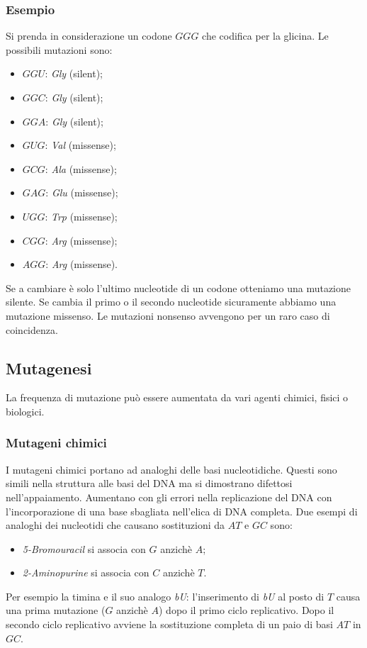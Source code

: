 		\subsubsection{Esempio}
		Si prenda in considerazione un codone $GGG$ che codifica per la glicina.
		Le possibili mutazioni sono:
		\begin{multicols}{3}
			\begin{itemize}
				\item $GGU$:  \emph{Gly} (silent);
				\item $GGC$: \emph{Gly} (silent);
				\item $GGA$:  \emph{Gly} (silent);
				\item $GUG$:  \emph{Val} (missense);
				\item $GCG$:  \emph{Ala} (missense);
				\item $GAG$:  \emph{Glu} (missense);
				\item $UGG$:  \emph{Trp} (missense);
				\item $CGG$:  \emph{Arg} (missense);
				\item $AGG$:  \emph{Arg} (missense).
			\end{itemize}
		\end{multicols}
		Se a cambiare è solo l'ultimo nucleotide di un codone otteniamo una mutazione silente. 
		Se cambia il primo o il secondo nucleotide sicuramente abbiamo una mutazione missenso. 
		Le mutazioni nonsenso avvengono per un raro caso di coincidenza. 

	\subsection{Mutagenesi}
	La frequenza di mutazione può essere aumentata da vari agenti chimici, fisici o biologici. 
  
		\subsubsection{Mutageni chimici}
		I mutageni chimici portano ad analoghi delle basi nucleotidiche. 
		Questi sono simili nella struttura alle basi del DNA ma si dimostrano difettosi nell'appaiamento. 
		Aumentano con gli errori nella replicazione del DNA con l'incorporazione di una base sbagliata nell'elica di DNA completa. 
		Due esempi di analoghi dei nucleotidi che causano sostituzioni da $AT$ e $GC$ sono:
		\begin{multicols}{2}
			\begin{itemize}
				\item \emph{5-Bromouracil} si associa con $G$ anzichè $A$; 
				\item \emph{2-Aminopurine} si associa con $C$ anzichè $T$. 
			\end{itemize}
		\end{multicols}
		Per esempio la timina e il suo analogo \emph{bU}: l'inserimento di \emph{bU} al posto di $T$ causa una prima mutazione ($G$ anzichè $A$) dopo il primo ciclo replicativo. 
		Dopo il secondo ciclo replicativo avviene la sostituzione completa di un paio di basi $AT$ in $GC$. 

